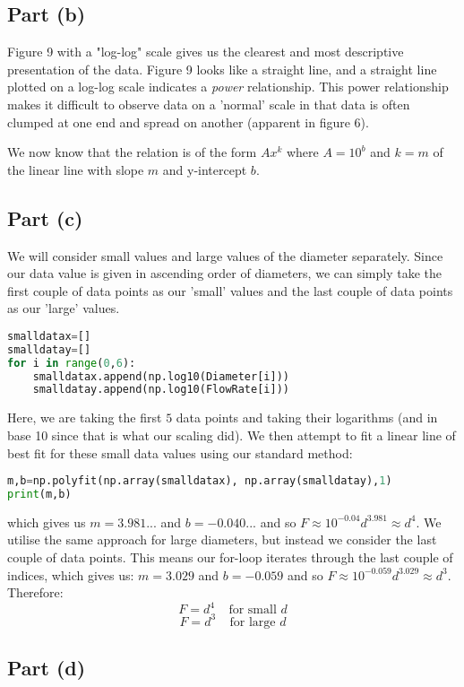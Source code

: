 \documentclass[11pt, oneside]{article}
\begin{document}
\subsection{Part (b)}
Figure 9 with a "log-log" scale gives us the clearest and most descriptive presentation of the data. Figure 9 looks like a straight line, and a straight line plotted on a log-log scale indicates a \textit{power} relationship. This power relationship makes it difficult to observe data on a 'normal' scale in that data is often clumped at one end and spread on another (apparent in figure 6). 

\bigskip
\noindent
We now know that the relation is of the form $Ax^k$ where $A=10^b$ and $k=m$ of the linear line with slope $m$ and y-intercept $b$. 
\subsection{Part (c)}
We will consider small values and large values of the diameter separately. Since our data value is given in ascending order of diameters, we can simply take the first couple of data points as our 'small' values and the last couple of data points as our 'large' values.
\begin{lstlisting}[language=Python, caption=Determining behaviour at small values of diameter]
smalldatax=[]
smalldatay=[]
for i in range(0,6):
	smalldatax.append(np.log10(Diameter[i]))
	smalldatay.append(np.log10(FlowRate[i]))
\end{lstlisting}
Here, we are taking the first $5$ data points and taking their logarithms (and in base 10 since that is what our scaling did). We then attempt to fit a linear line of best fit for these small data values using our standard method:
\begin{lstlisting}[language=Python]
m,b=np.polyfit(np.array(smalldatax), np.array(smalldatay),1)
print(m,b)
\end{lstlisting}
which gives us $m=3.981...$ and $b=-0.040...$ and so $F\approx 10^{-0.04}d^{3.981}\approx d^4$. We utilise the same approach for large diameters, but instead we consider the last couple of data points. This means our for-loop iterates through the last couple of indices, which gives us: $m=3.029$ and $b=-0.059$ and so $F\approx 10^{-0.059}d^{3.029}\approx d^3$. Therefore:
\begin{equation}
\boxed{F=d^4} \ \ \ \ \ \text{for small }d
\end{equation}
\begin{equation}
\boxed{F=d^3} \ \ \ \ \ \text{for large }d
\end{equation}
\subsection{Part (d)}
\end{document}
